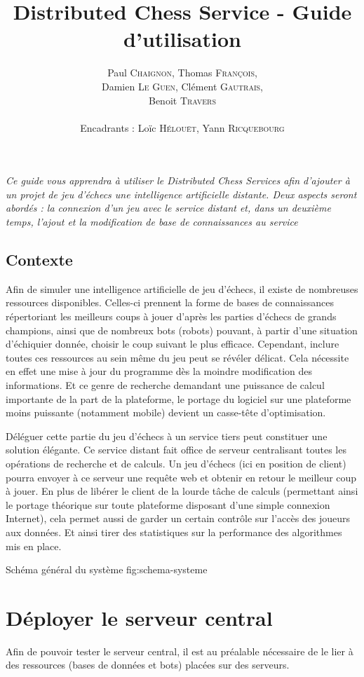 \documentclass[a4paper,11pt]{article}
\title{ \textbf{Distributed Chess Service - Guide d'utilisation} }
\author{Paul \textsc{Chaignon}, Thomas \textsc{François}, \\
        Damien \textsc{Le Guen}, Clément \textsc{Gautrais}, \\
				Benoit \textsc{Travers} \\
        \\
        Encadrants : Loïc \textsc{Hélouët}, Yann \textsc{Ricquebourg}}
\date{}                    %
\begin{document}
\maketitle{}

{\em Ce guide vous apprendra à utiliser le Distributed Chess Services afin d'ajouter à un projet de jeu d'échecs une intelligence artificielle distante.
Deux aspects seront abordés : la connexion d'un jeu avec le service distant et, dans un deuxième temps, l'ajout et la modification de base de connaissances au service}


\subsection*{Contexte}
Afin de simuler une intelligence artificielle de jeu d'échecs, il existe de nombreuses ressources disponibles.
Celles-ci prennent la forme de bases de connaissances répertoriant les meilleurs coups à jouer d'après les parties d'échecs de grands champions, ainsi que de nombreux bots (robots) pouvant, à partir d'une situation d'échiquier donnée, choisir le coup suivant le plus efficace.
Cependant, inclure toutes ces ressources au sein même du jeu peut se révéler délicat.
Cela nécessite en effet une mise à jour du programme dès la moindre modification des informations. Et ce genre de recherche demandant une puissance de calcul importante de la part de la plateforme, le portage du logiciel sur une plateforme moins puissante (notamment mobile) devient un casse-tête d'optimisation.

        
Déléguer cette partie du jeu d'échecs à un service tiers peut constituer une solution élégante.
Ce service distant fait office de serveur centralisant toutes les opérations de recherche et de calculs.
Un jeu d'échecs (ici en position de client) pourra envoyer à ce serveur une requête web et obtenir en retour le meilleur coup à jouer.
En plus de libérer le client de la lourde tâche de calculs (permettant ainsi le portage théorique sur toute plateforme disposant d'une simple connexion Internet), cela permet aussi de garder un certain contrôle sur l'accès des joueurs aux données.
Et ainsi tirer des statistiques sur la performance des algorithmes mis en place.

{Schéma général du système}
{fig:schema-systeme}


\section{Déployer le serveur central}
Afin de pouvoir tester le serveur central, il est au préalable nécessaire de le lier à des ressources (bases de données et bots) placées sur des serveurs.
\end{document}
